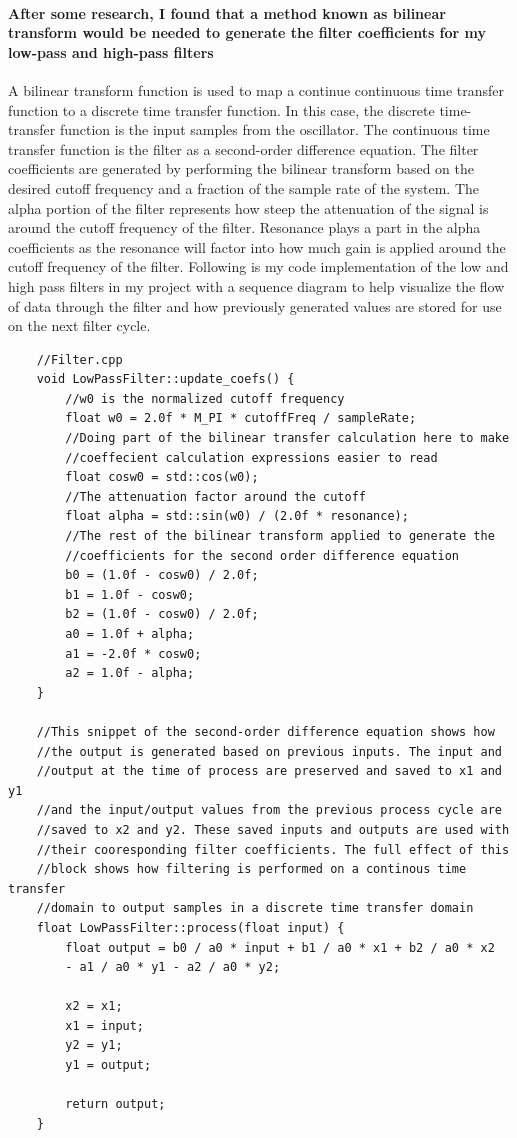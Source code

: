 \documentclass[acmlarge,screen]{acmart}
\begin{document}
	\paragraph{After some research, I found that a method known as bilinear transform would be needed to generate the filter coefficients for my low-pass and high-pass filters} A bilinear transform function is used to map a continue continuous time transfer function to a discrete time transfer function. In this case, the discrete time-transfer function is the input samples from the oscillator. The continuous time transfer function is the filter as a second-order difference equation. The filter coefficients are generated by performing the bilinear transform based on the desired cutoff frequency and a fraction of the sample rate of the system.\cite{stanford_2007} The alpha portion of the filter represents how steep the attenuation of the signal is around the cutoff frequency of the filter. Resonance plays a part in the alpha coefficients as the resonance will factor into how much gain is applied around the cutoff frequency of the filter. Following is my code implementation of the low and high pass filters in my project with a sequence diagram to help visualize the flow of data through the filter and how previously generated values are stored for use on the next filter cycle.

	\begin{verbatim}
	//Filter.cpp
	void LowPassFilter::update_coefs() {
		//w0 is the normalized cutoff frequency
		float w0 = 2.0f * M_PI * cutoffFreq / sampleRate;
		//Doing part of the bilinear transfer calculation here to make
		//coeffecient calculation expressions easier to read
		float cosw0 = std::cos(w0); 
		//The attenuation factor around the cutoff
		float alpha = std::sin(w0) / (2.0f * resonance); 
		//The rest of the bilinear transform applied to generate the 
		//coefficients for the second order difference equation
		b0 = (1.0f - cosw0) / 2.0f;
		b1 = 1.0f - cosw0;
		b2 = (1.0f - cosw0) / 2.0f;
		a0 = 1.0f + alpha;
		a1 = -2.0f * cosw0;
		a2 = 1.0f - alpha;
	}
	
	//This snippet of the second-order difference equation shows how
	//the output is generated based on previous inputs. The input and
	//output at the time of process are preserved and saved to x1 and y1
	//and the input/output values from the previous process cycle are
	//saved to x2 and y2. These saved inputs and outputs are used with
	//their cooresponding filter coefficients. The full effect of this
	//block shows how filtering is performed on a continous time transfer
	//domain to output samples in a discrete time transfer domain
	float LowPassFilter::process(float input) {
		float output = b0 / a0 * input + b1 / a0 * x1 + b2 / a0 * x2
		- a1 / a0 * y1 - a2 / a0 * y2;
		
		x2 = x1;
		x1 = input;
		y2 = y1;
		y1 = output;
		
		return output;
	}
	\end{verbatim}
\end{document}
